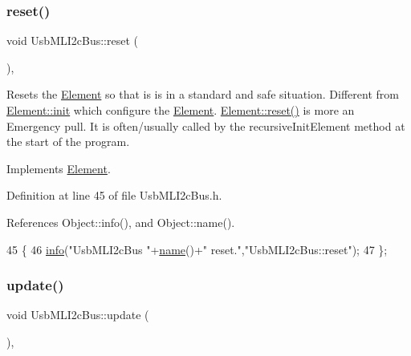 \subsubsection{\texorpdfstring{reset()}{reset()}}
{\footnotesize\ttfamily void Usb\+M\+L\+I2c\+Bus\+::reset (\begin{DoxyParamCaption}{ }\end{DoxyParamCaption})\hspace{0.3cm}{\ttfamily [inline]}, {\ttfamily [virtual]}}

Resets the \hyperlink{classElement}{Element} so that is is in a standard and safe situation. Different from \hyperlink{classElement_af42754b5cabc198869222725218d695c}{Element\+::init} which configure the \hyperlink{classElement}{Element}. \hyperlink{classElement_a69efffa22f06909d768149715565cb56}{Element\+::reset()} is more an Emergency pull. It is often/usually called by the recursive\+Init\+Element method at the start of the program. 

Implements \hyperlink{classElement_a69efffa22f06909d768149715565cb56}{Element}.



Definition at line 45 of file Usb\+M\+L\+I2c\+Bus.\+h.



References Object\+::info(), and Object\+::name().


\begin{DoxyCode}
45                \{
46     \hyperlink{classObject_a644fd329ea4cb85f54fa6846484b84a8}{info}(\textcolor{stringliteral}{"UsbMLI2cBus "}+\hyperlink{classObject_a300f4c05dd468c7bb8b3c968868443c1}{name}()+\textcolor{stringliteral}{" reset."},\textcolor{stringliteral}{"UsbMLI2cBus::reset"});
47   \};
\end{DoxyCode}
\mbox{\label{classUsbMLI2cBus_a6a9d70c1f0948b35c55689065ce97b55}} 
\subsubsection{\texorpdfstring{update()}{update()}}
{\footnotesize\ttfamily void Usb\+M\+L\+I2c\+Bus\+::update (\begin{DoxyParamCaption}{ }\end{DoxyParamCaption})\hspace{0.3cm}{\ttfamily [inline]}, {\ttfamily [virtual]}}

